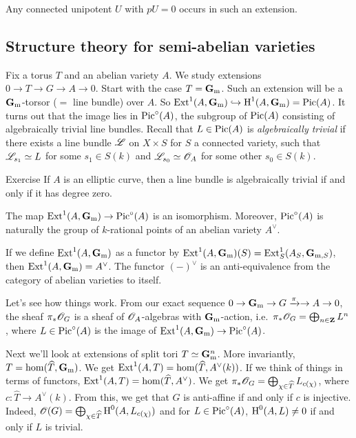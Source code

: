 Any connected unipotent $U$ with $p U=0$ occurs in such an extension. 





\subsection{Structure theory for semi-abelian varieties}

Fix a torus $T$ and an abelian variety $A$. We study extensions 
$0 \to T \to G \to A \to 0$. Start with the case $T=\mathbf{G}_{\mathrm{m}}$. Such an 
extension will be a $\mathbf{G}_{\mathrm{m}}$-torsor ($=$ line bundle) over $A$. So 
$\operatorname{Ext}^1(A,\mathbf{G}_{\mathrm{m}})\hookrightarrow \operatorname{H}^1(A,\mathbf{G}_{\mathrm{m}})=\operatorname{Pic}(A)$. It 
turns out that the image lies in $\operatorname{Pic}^\circ(A)$, the subgroup of 
$\operatorname{Pic}(A)$ consisting of algebraically trivial line bundles. Recall that 
$L\in\operatorname{Pic}(A)$ is \emph{algebraically trivial} if there exists a line bundle 
$\mathscr{L}$ on $X\times S$ for $S$ a connected variety, such that 
$\mathscr{L}_{s_1}\simeq L$ for some $s_1\in S(k)$ and $\mathscr{L}_{s_0}\simeq \mathscr{O}_A$ for 
some other $s_0\in S(k)$. 

\begin{enonce}{Exercise}
If $A$ is an elliptic curve, then a line bundle is algebraically trivial if and 
only if it has degree zero. 
\end{enonce}

\begin{theo}
The map $\operatorname{Ext}^1(A,\mathbf{G}_{\mathrm{m}}) \to \operatorname{Pic}^\circ(A)$ is an isomorphism. 
Moreover, $\operatorname{Pic}^\circ(A)$ is naturally the group of $k$-rational points of 
an abelian variety $A^\vee$. 
\end{theo}

If we define $\operatorname{Ext}^1(A,\mathbf{G}_{\mathrm{m}})$ as a functor by 
$\operatorname{Ext}^1(A,\mathbf{G}_{\mathrm{m}})(S)=\operatorname{Ext}_S^1(A_S,\mathbf{G}_{\mathrm{m},S})$, then 
$\operatorname{Ext}^1(A,\mathbf{G}_{\mathrm{m}})=A^\vee$. The functor $(-)^\vee$ is an 
anti-equivalence from the category of abelian varieties to itself. 

Let's see how things work. From our exact sequence 
$0 \to \mathbf{G}_{\mathrm{m}} \to G \xrightarrow\pi \to A \to 0$, the sheaf 
$\pi_\ast \mathscr{O}_G$ is a sheaf of $\mathscr{O}_A$-algebras with $\mathbf{G}_{\mathrm{m}}$-action, i.e.\ 
$\pi_\ast \mathscr{O}_G=\bigoplus_{n\in\mathbf{Z}} L^n$, where $L\in \operatorname{Pic}^\circ(A)$ is the 
image of $\operatorname{Ext}^1(A,\mathbf{G}_{\mathrm{m}})\to \operatorname{Pic}^\circ(A)$. 

Next we'll look at extensions of split tori $T\simeq \mathbf{G}_{\mathrm{m}}^n$. More 
invariantly, $T=\hom(\widehat T,\mathbf{G}_{\mathrm{m}})$. We get 
$\operatorname{Ext}^1(A,T) = \hom(\widehat T,A^\vee(k))$. If we think of things in 
terms of functors, $\operatorname{Ext}^1(A,T)=\hom(\widehat T,A^\vee)$. We get 
$\pi_\ast \mathscr{O}_G=\bigoplus_{\chi\in \widehat T} L_{c(\chi)}$, where 
$c:\widehat T\to A^\vee(k)$. From this, we get that $G$ is anti-affine 
if and only if $c$ is injective. Indeed, 
$\mathscr{O}(G)=\bigoplus_{\chi \in \widehat T} \operatorname{H}^0(A,L_{c(\chi)})$ and for 
$L\in \operatorname{Pic}^\circ(A)$, $\operatorname{H}^0(A,L)\ne 0$ if and only if $L$ is trivial. 

